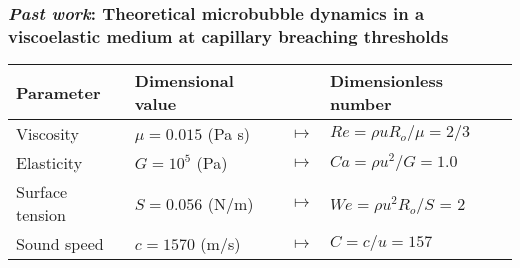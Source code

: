 \begin{frame} \frametitle{\textit{Past work}: Theoretical microbubble dynamics in a viscoelastic medium at capillary breaching thresholds}
  \vspace*{\fill}
  \begin{minipage}{\textwidth}
    \begin{minipage}{0.3\textwidth}
      \begin{figure}
        \centering
            \hfill%
        
      \end{figure}
    \end{minipage}
    \begin{minipage}{0.68\linewidth}
      {\tiny
        \vspace*{2pt}

        \vspace*{0.5cm}
        \begin{tabular}{l l c l}
          Parameter & Dimensional value & & Dimensionless number \\ \hline
          Viscosity & $\mu=0.015$ (Pa s) & $\mapsto$ & $Re=\rho u R_o / \mu = 2/3$ \\
          Elasticity & $G=10^5$ (Pa) & $\mapsto$ & $Ca= \rho u^2 / G = 1.0$ 	\\
          Surface tension & $S=0.056$ (N/m) & $\mapsto$ & $We=\rho u^2 R_o / S$ = 2 \\
          Sound speed & $c=1570$ (m/s) & $\mapsto$ & $C = c/u=157$ \\  
        \end{tabular} 
      }
    \end{minipage}
  \end{minipage}


\end{frame}
